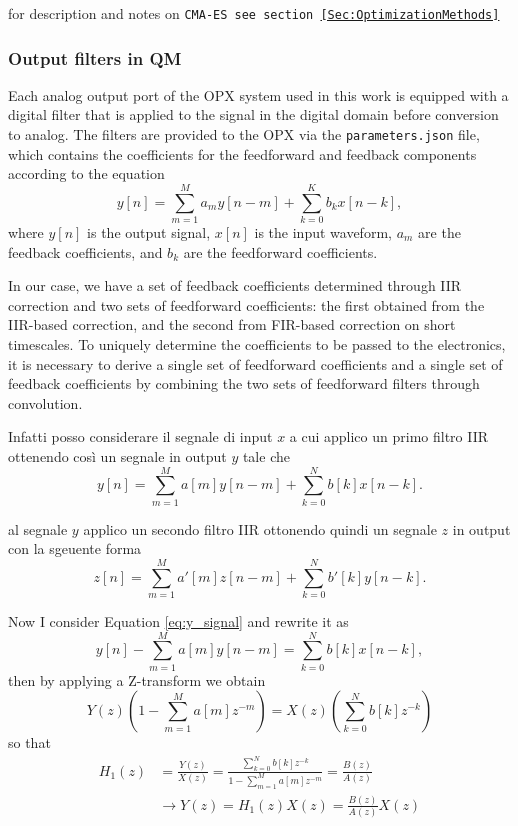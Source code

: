 for description and notes on \tt{CMA-ES} see section \ref{Sec:OptimizationMethods}

\subsubsection{Output filters in QM}

Each analog output port of the OPX system used in this work is equipped with a digital filter that is applied to the signal in the digital domain before conversion to analog. 
The filters are provided to the OPX via the \texttt{parameters.json} file, which contains the coefficients for the feedforward and feedback components according to the equation
\begin{equation}\label{eq:OPX_filter}
    y[n] = \sum_{m=1}^{M} a_m y[n - m] + \sum_{k=0}^{K} b_k x[n - k],
\end{equation}
where $y[n]$ is the output signal, $x[n]$ is the input waveform, $a_m$ are the feedback coefficients, and $b_k$ are the feedforward coefficients.

In our case, we have a set of feedback coefficients determined through IIR correction and two sets of feedforward coefficients: the first obtained from the IIR-based correction, and the second from FIR-based correction on short timescales. 
To uniquely determine the coefficients to be passed to the electronics, it is necessary to derive a single set of feedforward coefficients and a single set of feedback coefficients by combining the two sets of feedforward filters through convolution.

Infatti posso considerare il segnale di input $x$ a cui applico un primo filtro IIR ottenendo così un segnale in output $y$ tale che
\begin{equation}\label{eq:y_signal}
    y[n] = \sum_{m=1}^{M} a[m]y[n-m] + \sum_{k=0}^{N} b[k] x[n-k].
\end{equation}

al segnale $y$ applico un secondo filtro IIR ottonendo quindi un segnale $z$ in output con la sgeuente forma 
\begin{equation}\label{eq:z_signal}
    z[n] = \sum_{m=1}^{M} a'[m]z[n-m] + \sum_{k=0}^{N} b'[k] y[n-k].
\end{equation}

Now I consider Equation \ref{eq:y_signal} and rewrite it as
\begin{equation}\label{eq:y_signal1}
    y[n] - \sum_{m=1}^{M} a[m]y[n-m] = \sum_{k=0}^{N} b[k] x[n-k],
\end{equation} 
then by applying a Z-transform we obtain
\begin{equation}\label{eq:y_signal_transform}
    Y(z)\left(1 - \sum_{m=1}^{M} a[m] z^{-m} \right) = X(z) \left( \sum_{k=0}^{N} b[k] z^{-k} \right)
\end{equation}
so that 
\begin{align}
    H_1(z) &= \frac{Y(z)}{X(z)} = \frac{\sum_{k=0}^{N} b[k] z^{-k}}{1 - \sum_{m=1}^{M} a[m] z^{-m}} = \frac{B(z)}{A(z)} \\
    & \rightarrow Y(z) = H_1(z)X(z) = \frac{B(z)}{A(z)}X(z) \\ \label{eq:transfer1}
\end{align}

